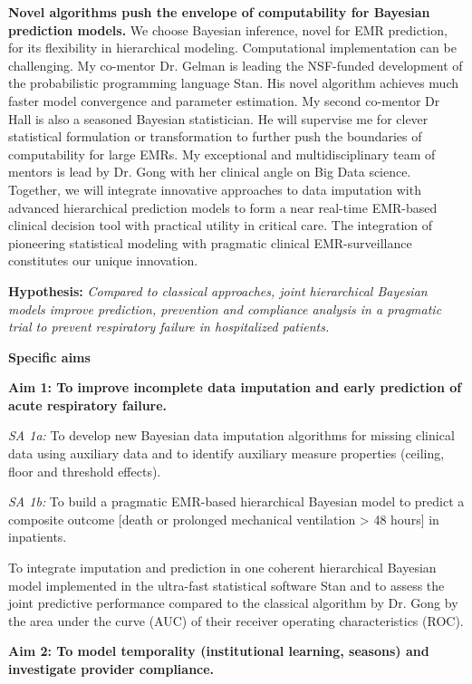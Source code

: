 \documentclass[11pt,notitlepage]{article}
\begin{document}
\textbf{Novel algorithms push the envelope of computability for Bayesian prediction models.} We choose Bayesian inference, novel for EMR prediction, for its flexibility in hierarchical modeling. Computational implementation can be challenging. My co-mentor Dr. Gelman is leading the NSF-funded development of the probabilistic programming language Stan. His novel algorithm achieves much faster model convergence and parameter estimation. My second co-mentor Dr Hall is also a seasoned Bayesian statistician. He will supervise me for clever statistical formulation or transformation to further push the boundaries of computability for large EMRs. My exceptional and multidisciplinary team of mentors is lead by Dr. Gong with her clinical angle on Big Data science. Together, we will integrate innovative approaches to data imputation with advanced hierarchical prediction models to form a near real-time EMR-based clinical decision tool with practical utility in critical care.  The integration of pioneering statistical modeling with pragmatic clinical EMR-surveillance constitutes our unique innovation.
\vspace{-5pt}
\begin{flushleft}
\textbf{Hypothesis:} \textit{Compared to classical approaches, joint hierarchical Bayesian models improve prediction, prevention and compliance analysis in a pragmatic trial to prevent respiratory failure in hospitalized patients.}
\end{flushleft}
\vspace{-5pt}
\textbf{Specific aims}
\vspace{-5pt}
\begin{flushleft}
\textbf{Aim 1: To improve incomplete data imputation and early prediction of acute respiratory failure.}
\end{flushleft}
\vspace{-8pt}

\textit{SA 1a:} To develop new Bayesian data imputation algorithms for missing clinical data using auxiliary data and to identify auxiliary measure properties (ceiling, floor and threshold effects).  

\textit{SA 1b:} To build a pragmatic EMR-based hierarchical Bayesian model to predict a composite outcome [death or prolonged mechanical ventilation > 48 hours] in inpatients. 

To integrate imputation and prediction in one coherent hierarchical Bayesian model implemented in the ultra-fast statistical software Stan and to assess the joint predictive performance compared to the classical algorithm by Dr. Gong by the area under the curve (AUC) of their receiver operating characteristics (ROC).
\vspace{-5pt}
\begin{flushleft}
\textbf{Aim 2: To model temporality (institutional learning, seasons) and investigate provider compliance.}
\end{flushleft}
\vspace{-10pt}
\end{document}
